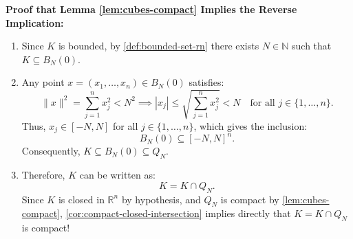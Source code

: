 \begin{proofWrapper}
\begin{content}
\textbf{Proof that Lemma \ref{lem:cubes-compact} Implies the Reverse Implication:}
\begin{enumerate}[label=\textbf{(\arabic*)}]
    \item Since $K$ is bounded, by \cref{def:bounded-set-rn} there exists $N \in \mathbb{N}$ such that $K \subseteq B_N(0)$.
    \item Any point $x = (x_1, \dots, x_n) \in B_N(0)$ satisfies:
    \[
    \|x\|^2 = \sum_{j=1}^n x_j^2 < N^2 \implies |x_j| \le \sqrt{\sum_{j=1}^n x_j^2} < N \quad \text{for all } j \in \{1, \dots, n\}.
    \]
    Thus, $x_j \in [-N, N]$ for all $j \in \{1, \dots, n\}$, which gives the inclusion:
    \begin{equation}\label{eq:ball-in-cube}
    B_N(0) \subseteq [-N, N]^n.
    \end{equation}
    Consequently, $K \subseteq B_N(0) \subseteq Q_N$.
    \item Therefore, $K$ can be written as:
    \[
    K = K \cap Q_N.
    \]
    Since $K$ is closed in $\mathbb{R}^n$ by hypothesis, and $Q_N$ is compact by \cref{lem:cubes-compact}, \cref{cor:compact-closed-intersection} implies directly that $K = K \cap Q_N$ is compact!
\end{enumerate}


\begin{center}
\end{center}
\end{content}
\end{proofWrapper}
